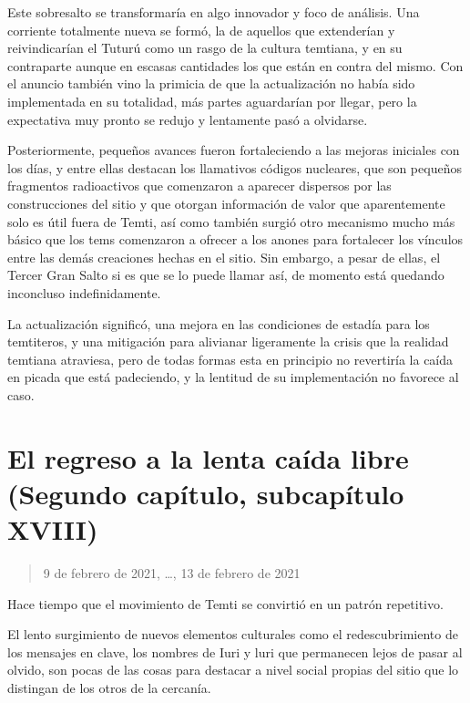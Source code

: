 \documentclass[
  spanish,
]{book}
\begin{document}
Este sobresalto se transformaría en algo innovador y foco de análisis. Una corriente totalmente nueva se formó, la de aquellos que extenderían y reivindicarían el Tuturú como un rasgo de la cultura temtiana, y en su contraparte aunque en escasas cantidades los que están en contra del mismo. Con el anuncio también vino la primicia de que la actualización no había sido implementada en su totalidad, más partes aguardarían por llegar, pero la expectativa muy pronto se redujo y lentamente pasó a olvidarse.

Posteriormente, pequeños avances fueron fortaleciendo a las mejoras iniciales con los días, y entre ellas destacan los llamativos códigos nucleares, que son pequeños fragmentos radioactivos que comenzaron a aparecer dispersos por las construcciones del sitio y que otorgan información de valor que aparentemente solo es útil fuera de Temti, así como también surgió otro mecanismo mucho más básico que los tems comenzaron a ofrecer a los anones para fortalecer los vínculos entre las demás creaciones hechas en el sitio. Sin embargo, a pesar de ellas, el Tercer Gran Salto si es que se lo puede llamar así, de momento está quedando inconcluso indefinidamente.

La actualización significó, una mejora en las condiciones de estadía para los temtiteros, y una mitigación para alivianar ligeramente la crisis que la realidad temtiana atraviesa, pero de todas formas esta en principio no revertiría la caída en picada que está padeciendo, y la lentitud de su implementación no favorece al caso.

\hypertarget{el-regreso-a-la-lenta-cauxedda-libre-segundo-capuxedtulo-subcapuxedtulo-xviii}{%
\section{El regreso a la lenta caída libre (Segundo capítulo, subcapítulo XVIII)}\label{el-regreso-a-la-lenta-cauxedda-libre-segundo-capuxedtulo-subcapuxedtulo-xviii}}

\begin{quote}
9 de febrero de 2021, \ldots, 13 de febrero de 2021
\end{quote}

Hace tiempo que el movimiento de Temti se convirtió en un patrón repetitivo.

El lento surgimiento de nuevos elementos culturales como el redescubrimiento de los mensajes en clave, los nombres de Iuri y luri que permanecen lejos de pasar al olvido, son pocas de las cosas para destacar a nivel social propias del sitio que lo distingan de los otros de la cercanía.
\end{document}
